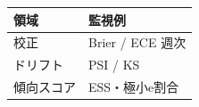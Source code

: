 \begin{tabular}{ll}
\toprule
領域 & 監視例 \\
\midrule
校正 & Brier / ECE 週次 \\

ドリフト & PSI / KS \\

傾向スコア & ESS・極小e割合 \\

\bottomrule
\end{tabular}
